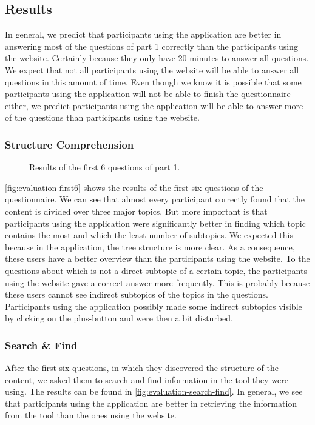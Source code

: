\subsection{Results}
In general, we predict that participants using the application are better in answering most of the questions of part 1 correctly than the participants using the website. Certainly because they only have 20 minutes to answer all questions. We expect that not all participants using the website will be able to answer all questions in this amount of time. Even though we know it is possible that some participants using the application will not be able to finish the questionnaire either, we predict participants using the application will be able to answer more of the questions than participants using the website.

\subsubsection{Structure Comprehension}

\begin{figure}[H]
	\centering
	\caption{Results of the first 6 questions of part 1.}
	\label{fig:evaluation-first6}
\end{figure}

\autoref{fig:evaluation-first6} shows the results of the first six questions of the questionnaire. We can see that almost every participant correctly found that the content is divided over three major topics. But more important is that participants using the application were significantly better in finding which topic contains the most and which the least number of subtopics. We expected this because in the application, the tree structure is more clear. As a consequence, these users have a better overview than the participants using the website. To the questions about which is not a direct subtopic of a certain topic, the participants using the website gave a correct answer more frequently. This is probably because these users cannot see indirect subtopics of the topics in the questions. Participants using the application possibly made some indirect subtopics visible by clicking on the plus-button and were then a bit disturbed.

\subsubsection{Search \& Find}
After the first six questions, in which they discovered the structure of the content, we asked them to search and find information in the tool they were using. The results can be found in \autoref{fig:evaluation-search-find}. In general, we see that participants using the application are better in retrieving the information from the tool than the ones using the website.

